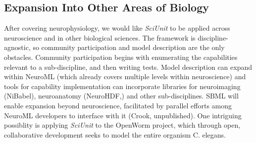 \documentclass[11pt,letterpaper]{article}
\begin{document}
\subsection{Expansion Into Other Areas of Biology}
After covering neurophysiology, we would like \textit{SciUnit} to be applied across neuroscience and in other biological sciences. 
The framework is discipline-agnostic, so community participation and model description are the only obstacles. 
Community participation begins with enumerating the capabilities relevant to a sub-discipline, and then writing tests. 
Model description can expand within NeuroML (which already covers multiple levels within neuroscience) and tools for capability implementation can incorporate libraries for neuroimaging (NiBabel\cite{nibabel_url}), neuroanatomy (NeuroHDF,\cite{neurohdf_url}) and other sub-disciplines. 
SBML\cite{hucka_systems_2003,sbml_url} will enable expansion beyond neuroscience, facilitated by parallel efforts among NeuroML developers to interface with it (Crook, unpublished). 
One intriguing possiblity is applying \textit{SciUnit} to the OpenWorm project\cite{open_worm_url}, which through open, collaborative development seeks to model the entire organism C. elegans.  



\end{document}
